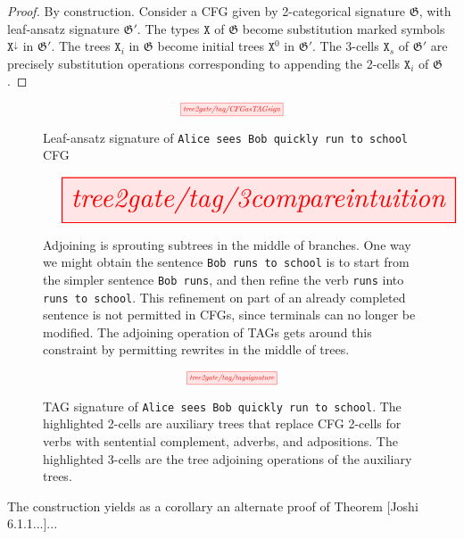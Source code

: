 \begin{proposition}\label{prop:cfgastag1}
\begin{proof}
By construction. Consider a CFG given by 2-categorical signature $\mathfrak{G}$, with leaf-ansatz signature $\mathfrak{G}'$. The types $\texttt{X}$ of $\mathfrak{G}$ become substitution marked symbols $\texttt{X}^{\downarrow}$ in $\mathfrak{G}'$. The trees $\texttt{X}_i$ in $\mathfrak{G}$ become initial trees $\texttt{X}^0$ in $\mathfrak{G}'$. The 3-cells $\texttt{X}_s$ of $\mathfrak{G}'$ are precisely substitution operations corresponding to appending the 2-cells $\texttt{X}_i$ of $\mathfrak{G}$.
\end{proof}
\end{proposition}

\clearpage
\begin{figure}
\[\scalebox{0.6}{\tikzfig{tree2gate/tag/CFGasTAGsign}}\]
\caption{Leaf-ansatz signature of \texttt{Alice sees Bob quickly run to school} CFG}
\end{figure}

\clearpage
\begin{figure}
\[\resizebox{\textwidth}{!}{\tikzfig{tree2gate/tag/3compareintuition}}\]
\caption{Adjoining is sprouting subtrees in the middle of branches. One way we might obtain the sentence \texttt{Bob runs to school} is to start from the simpler sentence \texttt{Bob runs}, and then refine the verb \texttt{runs} into \texttt{runs to school}. This refinement on part of an already completed sentence is not permitted in CFGs, since terminals can no longer be modified. The adjoining operation of TAGs gets around this constraint by permitting rewrites in the middle of trees.}
\end{figure}

\clearpage
\begin{figure}
\[\scalebox{0.6}{\tikzfig{tree2gate/tag/tagsignature}}\]
\caption{TAG signature of \texttt{Alice sees Bob quickly run to school}. The highlighted 2-cells are auxiliary trees that replace CFG 2-cells for verbs with sentential complement, adverbs, and adpositions. The highlighted 3-cells are the tree adjoining operations of the auxiliary trees.}
\end{figure}
\clearpage

The construction yields as a corollary an alternate proof of Theorem [Joshi 6.1.1...]...


